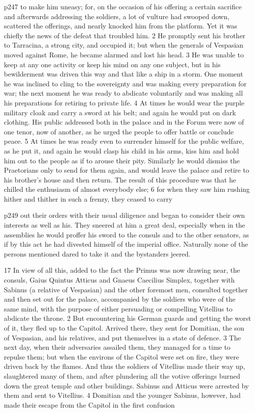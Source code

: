 p247 to make him uneasy; for, on the occasion of his offering a certain sacrifice and afterwards addressing the soldiers, a lot of vulture had swooped down, scattered the offerings, and nearly knocked him from the platform. Yet it was chiefly the news of the defeat that troubled him. 2 He promptly sent his brother to Tarracina, a strong city, and occupied it; but when the generals of Vespasian moved against Rome, he became alarmed and lost his head. 3 He was unable to keep at any one activity or keep his mind on any one subject, but in his bewilderment was driven this way and that like a ship in a storm. One moment he was inclined to cling to the sovereignty and was making every preparation for war; the next moment he was ready to abdicate voluntarily and was making all his preparations for retiring to private life. 4 At times he would wear the purple military cloak and carry a sword at his belt; and again he would put on dark clothing. His public addressed both in the palace and in the Forum were now of one tenor, now of another, as he urged the people to offer battle or conclude peace. 5 At times he was ready even to surrender himself for the public welfare, as he put it, and again he would clasp his child in his arms, kiss him and hold him out to the people as if to arouse their pity. Similarly he would dismiss the Praetorians only to send for them again, and would leave the palace and retire to his brother's house and then return. The result of this procedure was that he chilled the enthusiasm of almost everybody else; 6 for when they saw him rushing hither and thither in such a frenzy, they ceased to carry

p249 out their orders with their usual diligence and began to consider their own interests as well as his. They sneered at him a great deal, especially when in the assemblies he would proffer his sword to the consuls and to the other senators, as if by this act he had divested himself of the imperial office. Naturally none of the persons mentioned dared to take it and the bystanders jeered.

17
In view of all this, added to the fact the Primus was now drawing near, the consuls, Gaius Quintus Atticus and Gnaeus Caecilius Simplex, together with Sabinus (a relative of Vespasian) and the other foremost men, consulted together and then set out for the palace, accompanied by the soldiers who were of the same mind, with the purpose of either persuading or compelling Vitellius to abdicate the throne. 2 But encountering his German guards and getting the worst of it, they fled up to the Capitol. Arrived there, they sent for Domitian, the son of Vespasian, and his relatives, and put themselves in a state of defence. 3 The next day, when their adversaries assailed them, they managed for a time to repulse them; but when the environs of the Capitol were set on fire, they were driven back by the flames. And thus the soldiers of Vitellius made their way up, slaughtered many of them, and after plundering all the votive offerings burned down the great temple and other buildings. Sabinus and Atticus were arrested by them and sent to Vitellius. 4 Domitian and the younger Sabinus, however, had made their escape from the Capitol in the first confusion

